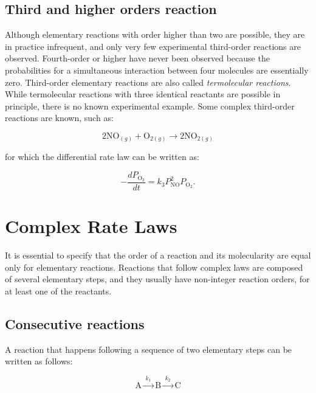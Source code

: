 \documentclass[
  9pt,
]{extbook}
\theoremstyle{definition}
\theoremstyle{definition}
\theoremstyle{definition}
\theoremstyle{definition}
\theoremstyle{remark}
\begin{document}
\subsection{Third and higher orders reaction}\label{third-and-higher-orders-reaction}

Although elementary reactions with order higher than two are possible, they are in practice infrequent, and only very few experimental third-order reactions are observed. Fourth-order or higher have never been observed because the probabilities for a simultaneous interaction between four molecules are essentially zero. Third-order elementary reactions are also called \emph{termolecular reactions}. While termolecular reactions with three identical reactants are possible in principle, there is no known experimental example. Some complex third-order reactions are known, such as:

\begin{equation}
2\text{NO}_{(g)}+\text{O}_{2(g)}\longrightarrow 2\text{NO}_{2(g)}
\end{equation}

for which the differential rate law can be written as:

\begin{equation}
-\frac{dP_{\mathrm{O}_2}}{dt}=k_3 P_{\mathrm{NO}}^2 P_{\mathrm{O}_2}.
\label{eq:kin17}
\end{equation}

\section{Complex Rate Laws}\label{complex-rate-laws}

It is essential to specify that the order of a reaction and its molecularity are equal only for elementary reactions. Reactions that follow complex laws are composed of several elementary steps, and they usually have non-integer reaction orders, for at least one of the reactants.

\subsection{Consecutive reactions}\label{consecutive-reactions}

A reaction that happens following a sequence of two elementary steps can be written as follows:

\begin{equation}
\text{A}\xrightarrow{\;k_1\;}\text{B}\xrightarrow{\;k_2\;}\text{C}
\end{equation}
\end{document}
